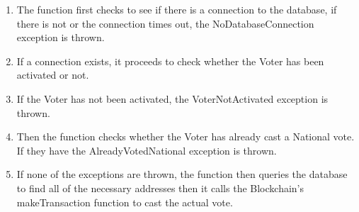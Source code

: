 \begin{enumerate}
\begin{enumerate}
		\begin{enumerate}
			\item The function first checks to see if there is a connection to the database, if there is not or the connection times out, the NoDatabaseConnection exception is thrown. 
			\item If a connection exists, it proceeds to check whether the Voter has been activated or not. 
			\item If the Voter has not been activated, the VoterNotActivated exception is thrown. 
			\item Then the function checks whether the Voter has already cast a National vote. If they have the AlreadyVotedNational exception is thrown.
			\item If none of the exceptions are thrown, the function then queries the database to find all of the necessary addresses then it calls the Blockchain's makeTransaction function to cast the actual vote.  
			
		\end{enumerate}
	\end{enumerate}
	\end{enumerate}

